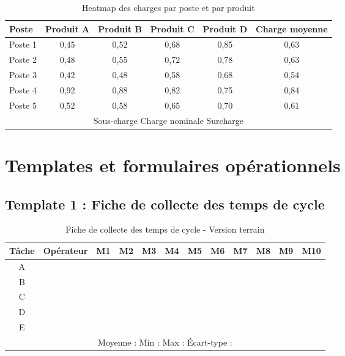 \documentclass[12pt,a4paper]{article}
\begin{document}
\begin{center}
\begin{table}[H]
\centering
\caption{Heatmap des charges par poste et par produit}
\label{tab:heatmap}
\begin{tabular}{|l|c|c|c|c|c|}
\hline
\textbf{Poste} & \textbf{Produit A} & \textbf{Produit B} & \textbf{Produit C} & \textbf{Produit D} & \textbf{Charge moyenne} \\ \hline
Poste 1 & \cellcolor{green!80} 0,45 & \cellcolor{green!60} 0,52 & \cellcolor{yellow!80} 0,68 & \cellcolor{red!60} 0,85 & 0,63 \\
Poste 2 & \cellcolor{green!70} 0,48 & \cellcolor{green!50} 0,55 & \cellcolor{yellow!60} 0,72 & \cellcolor{red!40} 0,78 & 0,63 \\
Poste 3 & \cellcolor{green!90} 0,42 & \cellcolor{green!80} 0,48 & \cellcolor{green!60} 0,58 & \cellcolor{yellow!80} 0,68 & 0,54 \\
Poste 4 & \cellcolor{red!80} 0,92 & \cellcolor{red!70} 0,88 & \cellcolor{red!60} 0,82 & \cellcolor{red!50} 0,75 & 0,84 \\
Poste 5 & \cellcolor{green!60} 0,52 & \cellcolor{green!50} 0,58 & \cellcolor{yellow!70} 0,65 & \cellcolor{yellow!60} 0,70 & 0,61 \\
\hline
\multicolumn{6}{|c|}{\cellcolor{green!50} Sous-charge \cellcolor{yellow!50} Charge nominale \cellcolor{red!50} Surcharge} \\
\end{tabular}
\end{table}

\section{Templates et formulaires opérationnels}

\subsection{Template 1 : Fiche de collecte des temps de cycle}

\begin{table}[H]
\centering
\caption{Fiche de collecte des temps de cycle - Version terrain}
\label{tab:template_temps}
\begin{tabular}{|c|l|c|c|c|c|c|c|c|c|c|c|}
\hline
\textbf{Tâche} & \textbf{Opérateur} & \textbf{M1} & \textbf{M2} & \textbf{M3} & \textbf{M4} & \textbf{M5} & \textbf{M6} & \textbf{M7} & \textbf{M8} & \textbf{M9} & \textbf{M10} \\ \hline
A & & & & & & & & & & & \\
B & & & & & & & & & & & \\
C & & & & & & & & & & & \\
D & & & & & & & & & & & \\
E & & & & & & & & & & & \\
\hline
\multicolumn{12}{|c|}{Moyenne : \hspace{2cm} Min : \hspace{2cm} Max : \hspace{2cm} Écart-type :} \\
\hline
\end{tabular}
\end{table}


\end{center}
\end{document}
